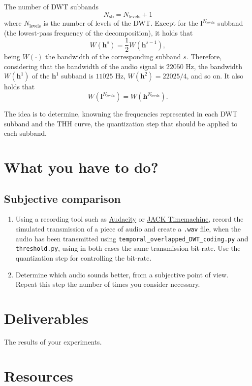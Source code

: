 The number of DWT subbands
\begin{equation}
  N_{\text{sb}} = N_{\text{levels}} + 1
\end{equation}
where $N_{\text{levels}}$ is the number of levels of the DWT. Except
for the ${\mathbf l}^{N_{\text{levels}}}$ subband (the lowest-pass
frequency of the decomposition), it holds that
\begin{equation}
  W({\mathbf h}^s) = \frac{1}{2}W({\mathbf h}^{s-1}),
\end{equation}
being $W(\cdot)$ the bandwidth of the corresponding
subband $s$. Therefore, considering that the bandwidth of the audio signal
is $22050$ Hz, the bandwidth $W({\mathbf h}^1)$ of the ${\mathbf h}^1$ subband is $11025$ Hz,
$W({\mathbf h} ^2)=22025/4$, and so on. It also holds that
\begin{equation}
  W({\mathbf l}^{N_{\text{levels}}}) = W({\mathbf h}^{N_{\text{levels}}}).
\end{equation}

The idea is to determine, knowning the frequencies represented in each
DWT subband and the THH curve, the quantization step that should be
applied to each subband.


\section{What you have to do?}

\subsection{Subjective comparison}

\begin{enumerate}
\item Using a recording tool such as
  \href{http://audacity.sourceforge.net}{Audacity} or
  \href{http://plugin.org.uk/timemachine/}{JACK Timemachine}, record
  the simulated transmission of a piece of audio and create a
  \texttt{.wav} file, when the audio has been transmitted using
  \texttt{temporal\_overlapped\_DWT\_coding.py} and
  \texttt{threshold.py}, using in both cases the same transmission
  bit-rate. Use the quantization step for controlling the bit-rate.
\item Determine which audio sounds better, from a subjective point of
  view. Repeat this step the number of times you consider necessary.
\end{enumerate}


    
\section{Deliverables}

The results of your experiments.

\section{Resources}


